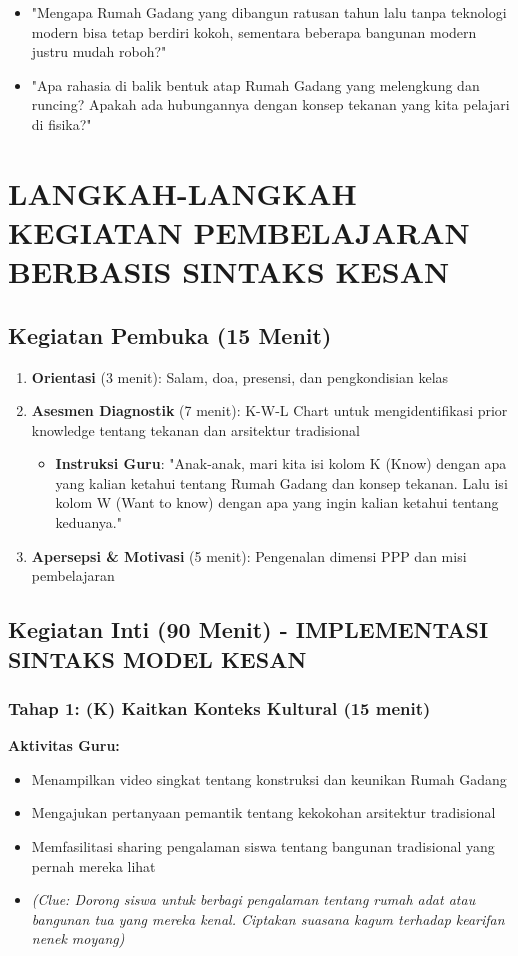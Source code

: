 \documentclass[12pt,a4paper]{article}
\begin{document}
\begin{itemize}
\item "Mengapa Rumah Gadang yang dibangun ratusan tahun lalu tanpa teknologi modern bisa tetap berdiri kokoh, sementara beberapa bangunan modern justru mudah roboh?"
\item "Apa rahasia di balik bentuk atap Rumah Gadang yang melengkung dan runcing? Apakah ada hubungannya dengan konsep tekanan yang kita pelajari di fisika?"
\end{itemize}

\section{LANGKAH-LANGKAH KEGIATAN PEMBELAJARAN BERBASIS SINTAKS KESAN}

\subsection{Kegiatan Pembuka (15 Menit)}

\begin{enumerate}
\item \textbf{Orientasi} (3 menit): Salam, doa, presensi, dan pengkondisian kelas
\item \textbf{Asesmen Diagnostik} (7 menit): K-W-L Chart untuk mengidentifikasi prior knowledge tentang tekanan dan arsitektur tradisional
   \begin{itemize}
   \item \textbf{Instruksi Guru}: "Anak-anak, mari kita isi kolom K (Know) dengan apa yang kalian ketahui tentang Rumah Gadang dan konsep tekanan. Lalu isi kolom W (Want to know) dengan apa yang ingin kalian ketahui tentang keduanya."
   \end{itemize}
\item \textbf{Apersepsi \& Motivasi} (5 menit): Pengenalan dimensi PPP dan misi pembelajaran
\end{enumerate}

\subsection{Kegiatan Inti (90 Menit) - IMPLEMENTASI SINTAKS MODEL KESAN}

\subsubsection{Tahap 1: (K) Kaitkan Konteks Kultural (15 menit)}

\textbf{Aktivitas Guru:}
\begin{itemize}
\item Menampilkan video singkat tentang konstruksi dan keunikan Rumah Gadang
\item Mengajukan pertanyaan pemantik tentang kekokohan arsitektur tradisional
\item Memfasilitasi sharing pengalaman siswa tentang bangunan tradisional yang pernah mereka lihat
\item \textit{(Clue: Dorong siswa untuk berbagi pengalaman tentang rumah adat atau bangunan tua yang mereka kenal. Ciptakan suasana kagum terhadap kearifan nenek moyang)}
\end{itemize}
\end{document}
